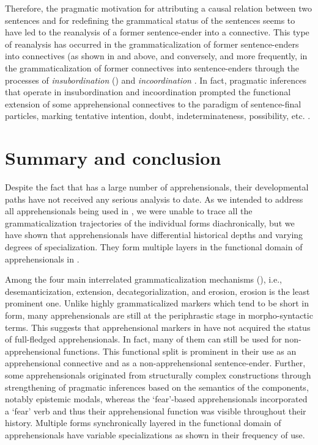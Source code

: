 \documentclass[output=paper,colorlinks,citecolor=brown]{langscibook}
\begin{document}
Therefore, the pragmatic motivation for attributing a causal relation between two sentences and for redefining the grammatical status of the sentences seems to have led to the reanalysis of a former sentence-ender into a connective. This type of reanalysis has occurred in the grammaticalization of former sentence-enders into connectives (as shown in  and  above, and conversely, and more frequently, in the grammaticalization of former connectives into sentence-enders through the processes of \textit{insubordination} (\citealt{evans2007,EvansWatanabe2016}) and \textit{incoordination} \citep{KutevaEtAl2015,KutevaEtAl2017}. In fact, pragmatic inferences that operate in insubordination and incoordination prompted the functional extension of some apprehensional connectives to the paradigm of sentence-final particles, marking tentative intention, doubt, indeterminateness, possibility, etc.  \citep{KooRhee2001,KooRhee2013,Sohn2003,RheeKoo2017}.



\section{Summary and conclusion}
\label{sec:rhee:summary}

Despite the fact that  has a large number of apprehensionals, their developmental paths have not received any serious analysis to date. As we intended to address all apprehensionals being used in , we were unable to trace all the grammaticalization trajectories of the individual forms diachronically, but we have shown that  apprehensionals have differential historical depths and varying degrees of specialization. They form multiple layers in the functional domain of apprehensionals in .

Among the four main interrelated grammaticalization mechanisms (\citealt[2]{HeineKuteva2002}), i.e., desemanticization, extension, decategorialization, and erosion, erosion is the least prominent one. Unlike highly grammaticalized markers which tend to be short in form, many apprehensionals are still at the periphrastic stage in morpho-syntactic terms. This suggests that apprehensional markers in  have not acquired the status of full-fledged apprehensionals. In fact, many of them can still be used for non-apprehensional functions. This functional split is prominent in their use as an apprehensional connective and as a non-apprehensional sentence-ender. Further, some apprehensionals originated from structurally complex constructions through strengthening of pragmatic inferences based on the semantics of the components, notably epistemic modals, whereas the `fear'-based apprehensionals incorporated a `fear' verb and thus their apprehensional function was visible throughout their history. Multiple forms synchronically layered in the functional domain of apprehensionals have variable specializations as shown in their frequency of use. 
\end{document}
